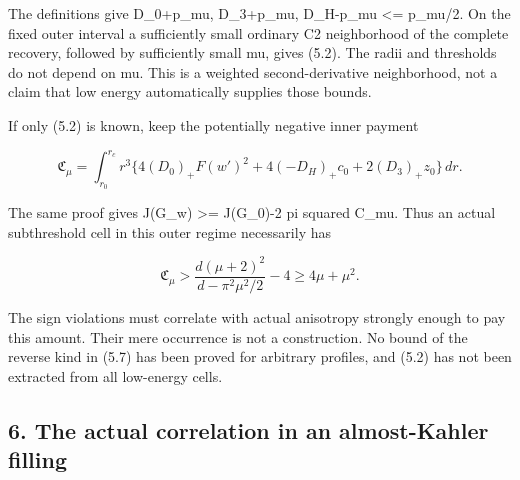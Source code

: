 \documentclass[
  10pt,
]{article}
\begin{document}
The definitions give \textbar D\_0+p\_mu\textbar,
\textbar D\_3+p\_mu\textbar, \textbar D\_H-p\_mu\textbar{} \textless=
p\_mu/2. On the fixed outer interval a sufficiently small ordinary C2
neighborhood of the complete recovery, followed by sufficiently small
mu, gives (5.2). The radii and thresholds do not depend on mu. This is a
weighted second-derivative neighborhood, not a claim that low energy
automatically supplies those bounds.

If only (5.2) is known, keep the potentially negative inner payment

\[
 \mathfrak C_\mu=\int_{r_0}^{r_c}r^3
 \{4(D_0)_+F(w')^2+4(-D_H)_+c_0+2(D_3)_+z_0\}\,dr.
\]

The same proof gives J(G\_w) \textgreater= J(G\_0)-2 pi squared C\_mu.
Thus an actual subthreshold cell in this outer regime necessarily has

\[
 \boxed{\mathfrak C_\mu>
       \frac{d(\mu+2)^2}{d-\pi^2\mu^2/2}-4
                                      \ge4\mu+\mu^2.}   \tag{5.7}
\]

The sign violations must correlate with actual anisotropy strongly
enough to pay this amount. Their mere occurrence is not a construction.
No bound of the reverse kind in (5.7) has been proved for arbitrary
profiles, and (5.2) has not been extracted from all low-energy cells.

\hypertarget{the-actual-correlation-in-an-almost-kahler-filling}{%
\subsection{6. The actual correlation in an almost-Kahler
filling}\label{the-actual-correlation-in-an-almost-kahler-filling}}
\end{document}
